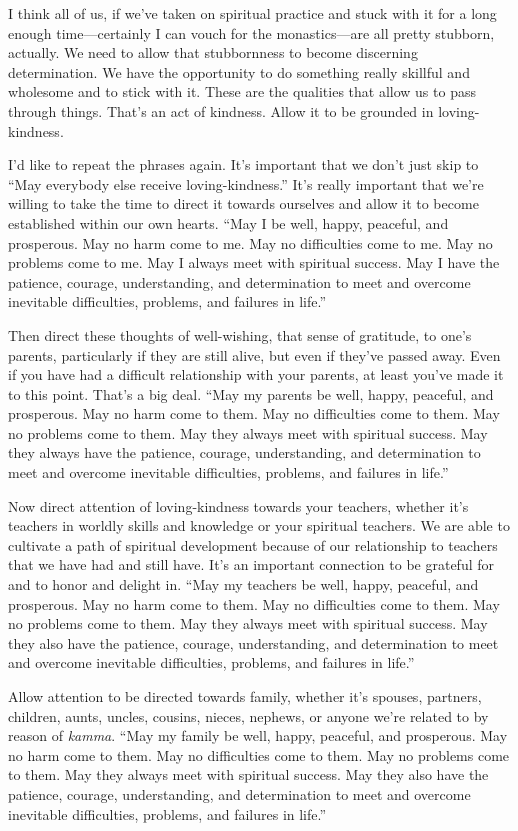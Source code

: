 I think all of us, if we’ve taken on spiritual practice and stuck with
it for a long enough time—certainly I can vouch for the monastics—are
all pretty stubborn, actually. We need to allow that stubbornness to
become discerning determination. We have the opportunity to do something
really skillful and wholesome and to stick with it. These are the
qualities that allow us to pass through things. That’s an act of
kindness. Allow it to be grounded in loving-kindness.

I’d like to repeat the phrases again. It’s important that we don’t just
skip to “May everybody else receive loving-kindness.” It’s really
important that we’re willing to take the time to direct it towards
ourselves and allow it to become established within our own hearts. “May
I be well, happy, peaceful, and prosperous. May no harm come to me. May
no difficulties come to me. May no problems come to me. May I always
meet with spiritual success. May I have the patience, courage,
understanding, and determination to meet and overcome inevitable
difficulties, problems, and failures in life.”

Then direct these thoughts of well-wishing, that sense of gratitude, to
one’s parents, particularly if they are still alive, but even if they’ve
passed away. Even if you have had a difficult relationship with your
parents, at least you’ve made it to this point. That’s a big deal. “May
my parents be well, happy, peaceful, and prosperous. May no harm come to
them. May no difficulties come to them. May no problems come to them.
May they always meet with spiritual success. May they always have the
patience, courage, understanding, and determination to meet and overcome
inevitable difficulties, problems, and failures in life.”

Now direct attention of loving-kindness towards your teachers, whether
it’s teachers in worldly skills and knowledge or your spiritual
teachers. We are able to cultivate a path of spiritual development
because of our relationship to teachers that we have had and still have.
It’s an important connection to be grateful for and to honor and delight
in. “May my teachers be well, happy, peaceful, and prosperous. May no
harm come to them. May no difficulties come to them. May no problems
come to them. May they always meet with spiritual success. May they also
have the patience, courage, understanding, and determination to meet and
overcome inevitable difficulties, problems, and failures in life.”

Allow attention to be directed towards family, whether it’s spouses,
partners, children, aunts, uncles, cousins, nieces, nephews, or anyone
we’re related to by reason of \emph{kamma}. “May my family be well,
happy, peaceful, and prosperous. May no harm come to them. May no
difficulties come to them. May no problems come to them. May they always
meet with spiritual success. May they also have the patience, courage,
understanding, and determination to meet and overcome inevitable
difficulties, problems, and failures in life.”


